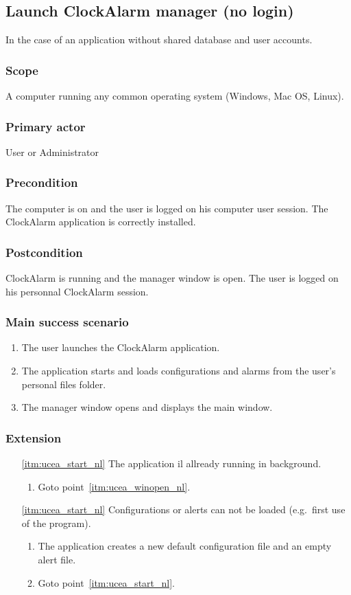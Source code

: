 \subsection{Launch ClockAlarm manager (no login)}
In the case of an application without shared database and user accounts.
\subsubsection{Scope}
A computer running any common operating system (Windows, Mac OS, Linux).
\subsubsection{Primary actor}
User or Administrator
\subsubsection{Precondition}
The computer is on and the user is logged on his computer user session. The ClockAlarm application is correctly installed.
\subsubsection{Postcondition}
ClockAlarm is running and the manager window is open. The user is logged on his personnal ClockAlarm session.
\subsubsection{Main success scenario}
\begin{enumerate}
	\item The user launches the ClockAlarm application.
	\item\label{itm:ucea_start_nl} The application starts and loads configurations and alarms from the user's personal files folder.
	\item\label{itm:ucea_winopen_nl} The manager window opens and displays the main window.
\end{enumerate}
\subsubsection{Extension}
\begin{enumerate}
	\item[\ref{itm:ucea_start_nl}] The application il allready running in background.
	\begin{enumerate}[i]
		\item Goto point~\ref{itm:ucea_winopen_nl}.
	\end{enumerate}
	
	\item[\ref{itm:ucea_start_nl}] Configurations or alerts can not be loaded (e.g.\ first use of the program).
	\begin{enumerate}[i]
		\item The application creates a new default configuration file and an empty alert file.
		\item Goto point~\ref{itm:ucea_start_nl}.
	\end{enumerate}
\end{enumerate}

